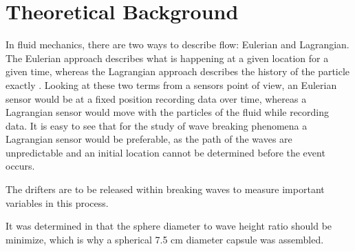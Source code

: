 \section{Theoretical Background}
In fluid mechanics, there are two ways to describe flow: Eulerian and Lagrangian.  The Eulerian approach describes what is happening at a given location for a given time, whereas the Lagrangian approach describes the history of the particle exactly \cite{Granger1985}.  Looking at these two terms from a sensors point of view, an Eulerian sensor would be at a fixed position recording data over time, whereas a Lagrangian sensor would move with the particles of the fluid while recording data.  It is easy to see that for the study of wave breaking phenomena a Lagrangian sensor would be preferable, as the path of the waves are unpredictable and an initial location cannot be determined before the event occurs.

The drifters are to be released within breaking waves to measure important variables in this process.

It was determined in \cite{Canals2012} that the sphere diameter to wave height ratio should be minimize, which is why a spherical 7.5 cm diameter capsule was assembled.